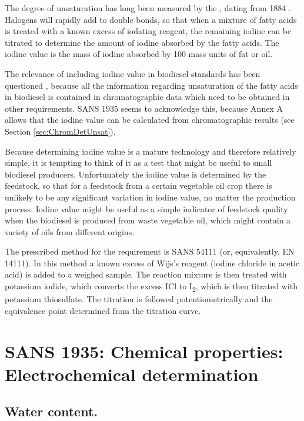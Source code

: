 
The degree of unsaturation has long been measured by the ,
dating from 1884 \autocite{Knothe2007}. Halogens will rapidly add to double
bonds, so that when a mixture of fatty acids is treated with a known excess of
iodating reagent, the remaining iodine can be titrated to determine the amount
of iodine absorbed by the fatty acids. The iodine value is the mass of iodine
absorbed by 100 mass units of fat or oil.

The relevance of including iodine value in biodiesel standards has been
questioned \autocite{Knothe2002}, because all the information regarding
unsaturation of the fatty acids in biodiesel is contained in chromatographic
data which need to be obtained in other requirements. SANS 1935 seems to
acknowledge this, because Annex A allows that the iodine value can be calculated
from chromatographic results (see Section \ref{sec:ChromDetUnsat}).

Because determining iodine value is a mature technology and therefore relatively
simple, it is tempting to think of it as a test that might be useful to small
biodiesel producers. Unfortunately the iodine value is determined by the
feedstock, so that for a feedstock from a certain vegetable oil crop there is
unlikely to be any significant variation in iodine value, no matter the
production process. Iodine value might be useful as a simple indicator of
feedstock quality when the biodiesel is produced from waste vegetable oil, which
might contain a variety of oils from different origins.

The prescribed method for the requirement is SANS 54111 (or, equivalently, EN
14111). In this method a known excess of Wijs's reagent (iodine chloride in
acetic acid) is added to a weighed sample. The reaction mixture is then treated
with potassium iodide, which converts the excess ICl to I\textsubscript{2},
which is then titrated with potassium thiosulfate. The titration is followed
potentiometrically and the equivalence point determined from the titration
curve.

\section{SANS 1935: Chemical properties: Electrochemical determination}

\subsection{Water content.}

